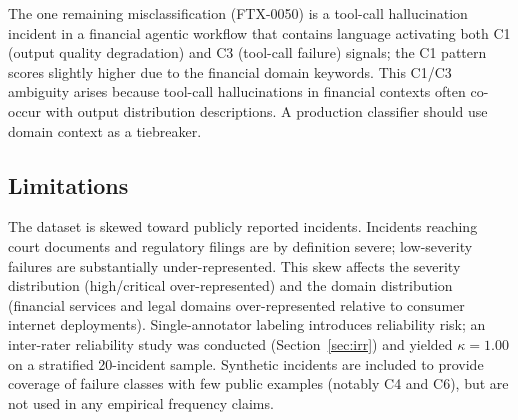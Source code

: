 \documentclass{article}
\begin{document}
\begin{table}[t]
\caption{Rule-based classifier precision and recall per class (evaluated on
all 50 labeled incidents).}
\label{tab:classifier}
\centering
\small
{}
\end{table}

The one remaining misclassification (FTX-0050) is a tool-call hallucination
incident in a financial agentic workflow that contains language activating both
C1 (output quality degradation) and C3 (tool-call failure) signals; the
C1 pattern scores slightly higher due to the financial domain keywords.
This C1/C3 ambiguity arises because tool-call hallucinations in financial
contexts often co-occur with output distribution descriptions.  A production
classifier should use domain context as a tiebreaker.

\subsection{Limitations}

The dataset is skewed toward publicly reported incidents.  Incidents reaching
court documents and regulatory filings are by definition severe; low-severity
failures are substantially under-represented.  This skew affects the severity
distribution (high/critical over-represented) and the domain distribution
(financial services and legal domains over-represented relative to consumer
internet deployments).  Single-annotator labeling introduces reliability risk;
an inter-rater reliability study was conducted (Section~\ref{sec:irr})
and yielded $\kappa = 1.00$ on a stratified 20-incident sample.
Synthetic incidents are included to provide coverage of failure classes with
few public examples (notably C4 and C6), but are not used in any empirical
frequency claims.
\end{document}
